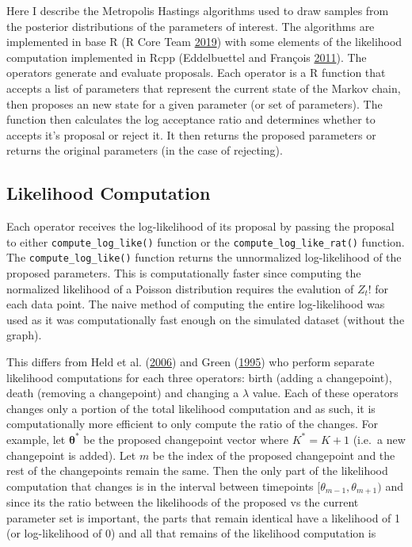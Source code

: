 \documentclass[11pt,a4paper]{article}
\numberwithin{equation}{section}
\begin{document}
Here I describe the Metropolis Hastings algorithms used to draw samples
from the posterior distributions of the parameters of interest. The
algorithms are implemented in base R (R Core Team
\protect\hyperlink{ref-r_core_team_r_2019}{2019}) with some elements of
the likelihood computation implemented in Rcpp (Eddelbuettel and
François \protect\hyperlink{ref-eddelbuettel_rcpp_2011}{2011}). The
operators generate and evaluate proposals. Each operator is a R function
that accepts a list of parameters that represent the current state of
the Markov chain, then proposes an new state for a given parameter (or
set of parameters). The function then calculates the log acceptance
ratio and determines whether to accepts it's proposal or reject it. It
then returns the proposed parameters or returns the original parameters
(in the case of rejecting).

\hypertarget{likelihood-computation}{%
\subsection{Likelihood Computation}\label{likelihood-computation}}

Each operator receives the log-likelihood of its proposal by passing the
proposal to either \texttt{compute\_log\_like()} function or the
\texttt{compute\_log\_like\_rat()} function. The
\texttt{compute\_log\_like()} function returns the unnormalized
log-likelihood of the proposed parameters. This is computationally
faster since computing the normalized likelihood of a Poisson
distribution requires the evalution of \(Z_{t}!\) for each data point.
The naive method of computing the entire log-likelihood was used as it
was computationally fast enough on the simulated dataset (without the
graph).

This differs from Held et al.
(\protect\hyperlink{ref-held_two-component_2006}{2006}) and Green
(\protect\hyperlink{ref-green_reversible_1995}{1995}) who perform
separate likelihood computations for each three operators: birth (adding
a changepoint), death (removing a changepoint) and changing a
\(\lambda\) value. Each of these operators changes only a portion of the
total likelihood computation and as such, it is computationally more
efficient to only compute the ratio of the changes. For example, let
\(\boldsymbol{\theta^*}\) be the proposed changepoint vector where
\(K^* = K + 1\) (i.e.~a new changepoint is added). Let \(m\) be the
index of the proposed changepoint and the rest of the changepoints
remain the same. Then the only part of the likelihood computation that
changes is in the interval between timepoints
\([\theta_{m-1}, \theta_{m+1})\) and since its the ratio between the
likelihoods of the proposed vs the current parameter set is important,
the parts that remain identical have a likelihood of 1 (or
log-likelihood of 0) and all that remains of the likelihood computation
is
\end{document}
